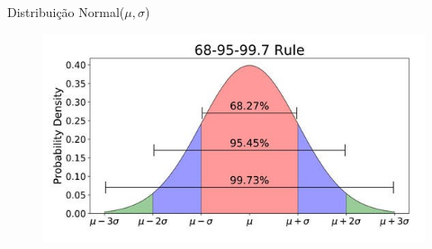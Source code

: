 \begin{frame}{Distribuição Normal($\mu, \sigma$)}
    \begin{figure}
        \centering
        \includegraphics[width=0.8\linewidth]{figures/normal_dp.jpg}
    \end{figure}
\end{frame}



      


